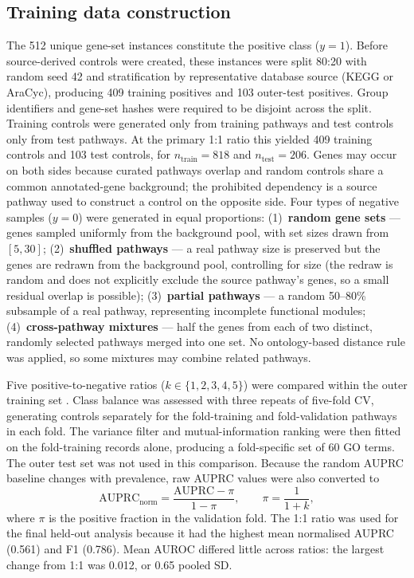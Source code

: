 \documentclass[12pt,twoside]{article}
\begin{document}
\subsection{Training data construction}
\label{sec:dataset}

The 512 unique gene-set instances constitute the positive class ($y = 1$). Before source-derived controls were created, these instances were split 80:20 with random seed 42 and stratification by representative database source (KEGG or AraCyc), producing 409 training positives and 103 outer-test positives. Group identifiers and gene-set hashes were required to be disjoint across the split. Training controls were generated only from training pathways and test controls only from test pathways. At the primary 1:1 ratio this yielded 409 training controls and 103 test controls, for $n_{\mathrm{train}}=818$ and $n_{\mathrm{test}}=206$. Genes may occur on both sides because curated pathways overlap and random controls share a common annotated-gene background; the prohibited dependency is a source pathway used to construct a control on the opposite side.
Four types of negative samples ($y = 0$) were generated in equal proportions:
(1)~\textbf{random gene sets} --- genes sampled uniformly from the background pool, with set sizes drawn from $[5,30]$;
(2)~\textbf{shuffled pathways} --- a real pathway size is preserved but the genes are redrawn from the background pool, controlling for size (the redraw is random and does not explicitly exclude the source pathway's genes, so a small residual overlap is possible);
(3)~\textbf{partial pathways} --- a random 50--80\% subsample of a real pathway, representing incomplete functional modules;
(4)~\textbf{cross-pathway mixtures} --- half the genes from each of two distinct, randomly selected pathways merged into one set. No ontology-based distance rule was applied, so some mixtures may combine related pathways.

Five positive-to-negative ratios ($k \in \{1,2,3,4,5\}$) were compared within the outer training set \citep{japkowicz2002class}. Class balance was assessed with three repeats of five-fold CV, generating controls separately for the fold-training and fold-validation pathways in each fold. The variance filter and mutual-information ranking were then fitted on the fold-training records alone, producing a fold-specific set of 60 GO terms. The outer test set was not used in this comparison. Because the random AUPRC baseline changes with prevalence, raw AUPRC values were also converted to
\begin{equation}
\mathrm{AUPRC}_{\mathrm{norm}} =
\frac{\mathrm{AUPRC}-\pi}{1-\pi}, \qquad \pi=\frac{1}{1+k},
\label{eq:normalized_auprc}
\end{equation}
where $\pi$ is the positive fraction in the validation fold. The 1:1 ratio was used for the final held-out analysis because it had the highest mean normalised AUPRC (0.561) and F1 (0.786). Mean AUROC differed little across ratios: the largest change from 1:1 was 0.012, or 0.65 pooled SD.
\end{document}
